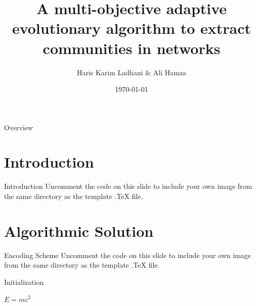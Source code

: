 \documentclass[aspectratio=169,xcolor=dvipsnames]{beamer}
\title[short title]{A multi-objective adaptive evolutionary algorithm to extract communities in networks} %
\author[Haris-Ali] {Haris Karim Ladhani \& Ali Hamza}
\institute[HU-CI] %
{
    CS 451 - Computational Intelligence \\
    Habib University %
}
\date{\today} %
\begin{document}
\begin{frame}
    \titlepage
\end{frame}

\begin{frame}{Overview}
    \tableofcontents
\end{frame}

\section{Introduction}

\begin{frame}{Introduction}
    Uncomment the code on this slide to include your own image from the same directory as the template .TeX file.
\end{frame}

\section{Algorithmic Solution}

\begin{frame}{Encoding Scheme}
    Uncomment the code on this slide to include your own image from the same directory as the template .TeX file.
\end{frame}


\begin{frame}{Initialization}
    \begin{theorem}
        $E = mc^2$
    \end{theorem}
\end{frame}
\end{document}
